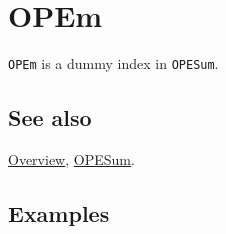 \documentclass[../FeynCalcManual.tex]{subfiles}
\begin{document}
\hypertarget{opem}{
\section{OPEm}\label{opem}}

\texttt{OPEm} is a dummy index in \texttt{OPESum}.

\subsection{See also}

\hyperlink{toc}{Overview}, \hyperlink{opesum}{OPESum}.

\subsection{Examples}
\end{document}
